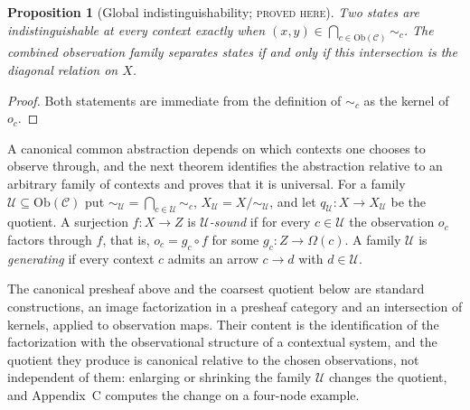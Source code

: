 \documentclass[11pt]{article}
\newtheorem{proposition}[theorem]{Proposition}
\theoremstyle{definition}
\theoremstyle{remark}
\newcommand{\stN}{\textsc{proved here}}
\newcommand{\cC}{\mathcal C}
\newcommand{\cU}{\mathcal U}
\newcommand{\Ob}{\mathrm{Ob}}
\newcommand{\sk}{\sim}
\begin{document}
\begin{proposition}[Global indistinguishability; \stN]\label{prop:globalindist}
Two states are indistinguishable at every context exactly when $(x,y)\in\bigcap_{c\in\Ob(\cC)}\sk_c$. The combined observation family separates states if and only if this intersection is the diagonal relation on $X$.
\end{proposition}
\begin{proof}
Both statements are immediate from the definition of $\sk_c$ as the kernel of $o_c$.
\end{proof}

A canonical common abstraction depends on which contexts one chooses to observe through, and the next theorem identifies the abstraction relative to an arbitrary family of contexts and proves that it is universal. For a family $\cU\subseteq\Ob(\cC)$ put ${\sk_\cU}=\bigcap_{c\in\cU}{\sk_c}$, $X_\cU=X/{\sk_\cU}$, and let $q_\cU:X\to X_\cU$ be the quotient. A surjection $f:X\to Z$ is \emph{$\cU$-sound} if for every $c\in\cU$ the observation $o_c$ factors through $f$, that is, $o_c=g_c\circ f$ for some $g_c:Z\to\Omega(c)$. A family $\cU$ is \emph{generating} if every context $c$ admits an arrow $c\to d$ with $d\in\cU$.

The canonical presheaf above and the coarsest quotient below are standard constructions, an image factorization in a presheaf category and an intersection of kernels, applied to observation maps. Their content is the identification of the factorization with the observational structure of a contextual system, and the quotient they produce is canonical relative to the chosen observations, not independent of them: enlarging or shrinking the family $\cU$ changes the quotient, and Appendix~C computes the change on a four-node example.
\end{document}
